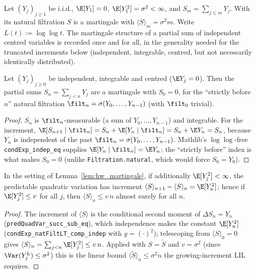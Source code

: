 Let $(Y_j)_{j\ge1}$ be i.i.d., $\E[Y_1]=0$, $\E[Y_1^2]=\sigma^2<\infty$, and
$S_m=\sum_{j\le m}Y_j$. With its natural filtration $S$ is a martingale with
$\langle S\rangle_m=\sigma^2 m$. Write $L(t):=\log\log t$. The martingale structure of a partial
sum of independent centred variables is recorded once and for all, in the generality needed for the
truncated increments below (independent, integrable, centred, but not necessarily identically
distributed).

\begin{lemma}\label{lem:hw_martingale}
\leanok
Let $(Y_j)_{j\ge0}$ be independent, integrable and centred ($\E Y_j=0$). Then the partial sums
$S_n=\sum_{j<n}Y_j$ are a martingale with $S_0=0$, for the ``strictly before $n$'' natural filtration
$\filt_n=\sigma(Y_0,\dots,Y_{n-1})$ (with $\filt_0$ trivial).
\end{lemma}
\begin{proof}\leanok
$S_n$ is $\filt_n$-measurable (a sum of $Y_0,\dots,Y_{n-1}$) and integrable. For the increment,
$\E[S_{n+1}\mid\filt_n]=S_n+\E[Y_n\mid\filt_n]=S_n+\E Y_n=S_n$, because $Y_n$ is independent of the
past $\filt_n=\sigma(Y_0,\dots,Y_{n-1})$. Mathlib's $\log\log$-free
\texttt{condExp\_indep\_eq} supplies $\E[Y_n\mid\filt_n]=\E Y_n$; the ``strictly before'' index is
what makes $S_0=0$ (unlike \texttt{Filtration.natural}, which would force $S_0=Y_0$).
\end{proof}

\begin{lemma}\label{lem:hw_qv}
\leanok
{}
In the setting of Lemma~\ref{lem:hw_martingale}, if additionally $\E[Y_j^2]<\infty$, the predictable
quadratic variation has increment $\langle S\rangle_{n+1}-\langle S\rangle_n=\E[Y_n^2]$; hence if
$\E[Y_j^2]\le v$ for all $j$, then $\langle S\rangle_n\le v\,n$ almost surely for all $n$.
\end{lemma}
\begin{proof}\leanok
The increment of $\langle S\rangle$ is the conditional second moment of $\Delta S_n=Y_n$
(\texttt{predQuadVar\_succ\_sub\_eq}), which independence makes the constant $\E[Y_n^2]$
(\texttt{condExp\_natFiltLT\_comp\_indep} with $g=(\cdot)^2$); telescoping from $\langle S\rangle_0=0$
gives $\langle S\rangle_n=\sum_{j<n}\E[Y_j^2]\le v\,n$. Applied with $S=\tilde S$ and $v=\sigma^2$
(since $\Var(Y_j^{\mathrm L})\le\sigma^2$) this is the linear bound $\langle\tilde S\rangle_n\le
\sigma^2 n$ the growing-increment LIL requires.
\end{proof}

